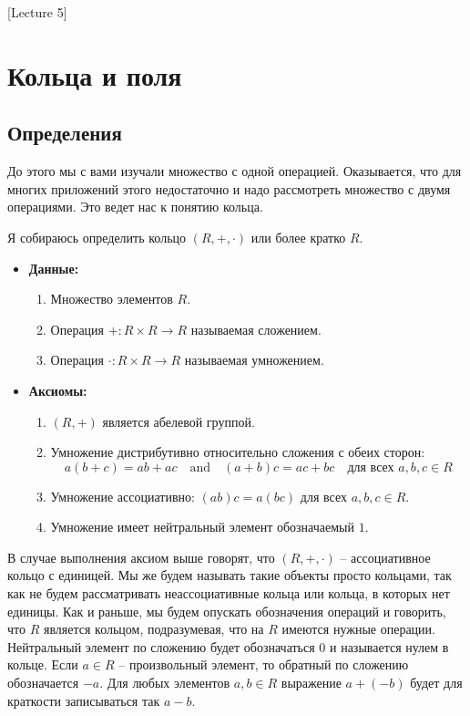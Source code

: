 [Lecture 5]


\section{Кольца и поля}

\subsection{Определения}

До этого мы с вами изучали множество с одной операцией.
Оказывается, что для многих приложений этого недостаточно и надо рассмотреть множество с двумя операциями.
Это ведет нас к понятию кольца.

\begin{definition}
Я собираюсь определить кольцо $(R, +, \cdot)$ или более кратко $R$.
\begin{itemize}
\item\textbf{Данные:} 
\begin{enumerate}
\item Множество элементов $R$.

\item Операция $+ \colon R\times R\to R$ называемая сложением.

\item Операция $\cdot \colon R\times R\to R$ называемая умножением.
\end{enumerate}

\item\textbf{Аксиомы:}
\begin{enumerate}
\item $(R, +)$ является абелевой группой.

\item Умножение дистрибутивно относительно сложения  с обеих сторон:
\[
a(b + c) = ab + ac \quad\text{and}\quad (a + b) c = ac + bc\quad \text{для всех }a, b, c\in R
\]

\item Умножение ассоциативно: $(ab)c = a(bc)$ для всех $a, b, c\in R$.

\item Умножение имеет нейтральный элемент обозначаемый $1$.
\end{enumerate}
\end{itemize}
В случае выполнения аксиом выше говорят, что $(R, +, \cdot)$ -- ассоциативное кольцо с единицей.
Мы же будем называть такие объекты просто кольцами, так как не будем рассматривать неассоциативные кольца или кольца, в которых нет единицы.
Как и раньше, мы будем опускать обозначения операций и говорить, что $R$ является кольцом, подразумевая, что на $R$ имеются нужные операции.
Нейтральный элемент по сложению будет обозначаться $0$ и называется нулем в кольце.
Если $a\in R$ -- произвольный элемент, то обратный по сложению обозначается $-a$.
Для любых элементов $a, b\in R$ выражение $a + (-b)$ будет для краткости записываться так $a - b$.


\end{definition}
